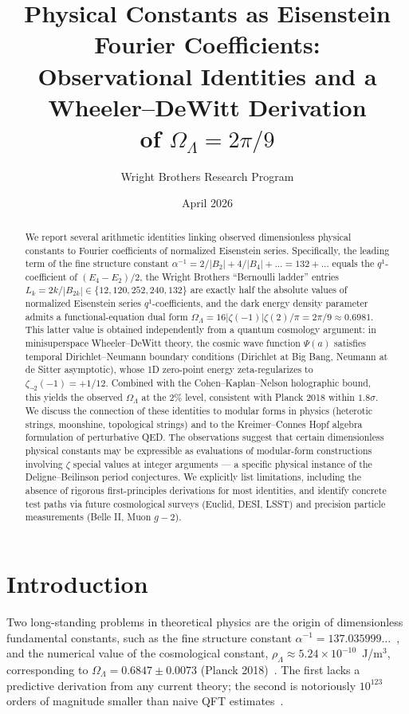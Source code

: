 \documentclass[11pt,a4paper]{article}
\title{Physical Constants as Eisenstein Fourier Coefficients:\\
Observational Identities and a Wheeler--DeWitt Derivation\\
of $\Omega_\Lambda = 2\pi/9$}
\author{Wright Brothers Research Program}
\date{April 2026}
\begin{document}
\maketitle

\begin{abstract}
We report several arithmetic identities linking observed dimensionless
physical constants to Fourier coefficients of normalized Eisenstein
series. Specifically, the leading term of the fine structure constant
$\alpha^{-1} = 2/|B_2| + 4/|B_4| + \ldots = 132 + \ldots$ equals the
$q^1$-coefficient of $(E_4 - E_2)/2$, the Wright Brothers ``Bernoulli
ladder'' entries $L_k = 2k/|B_{2k}| \in \{12, 120, 252, 240, 132\}$
are exactly half the absolute values of normalized Eisenstein series
$q^1$-coefficients, and the dark energy density parameter admits a
functional-equation dual form
$\Omega_\Lambda = 16|\zeta(-1)|\zeta(2)/\pi = 2\pi/9 \approx 0.6981$.
This latter value is obtained independently from a quantum cosmology
argument: in minisuperspace Wheeler--DeWitt theory, the cosmic wave
function $\Psi(a)$ satisfies temporal Dirichlet--Neumann boundary
conditions (Dirichlet at Big Bang, Neumann at de Sitter asymptotic),
whose 1D zero-point energy zeta-regularizes to $\zeta_{\neg 2}(-1) =
+1/12$. Combined with the Cohen--Kaplan--Nelson holographic bound,
this yields the observed $\Omega_\Lambda$ at the 2\% level, consistent
with Planck 2018 within $1.8\sigma$. We discuss the connection of
these identities to modular forms in physics (heterotic strings,
moonshine, topological strings) and to the Kreimer--Connes Hopf
algebra formulation of perturbative QED. The observations suggest
that certain dimensionless physical constants may be expressible as
evaluations of modular-form constructions involving $\zeta$ special
values at integer arguments --- a specific physical instance of the
Deligne--Beilinson period conjectures. We explicitly list limitations,
including the absence of rigorous first-principles derivations for
most identities, and identify concrete test paths via future
cosmological surveys (Euclid, DESI, LSST) and precision particle
measurements (Belle II, Muon $g-2$).
\end{abstract}

\section{Introduction}

Two long-standing problems in theoretical physics are the origin of
dimensionless fundamental constants, such as the fine structure
constant $\alpha^{-1} = 137.035999\ldots$~\cite{Mohr2016}, and the
numerical value of the cosmological constant, $\rho_\Lambda \approx
5.24 \times 10^{-10}$~J/m$^3$, corresponding to
$\Omega_\Lambda = 0.6847 \pm 0.0073$ (Planck 2018)~\cite{Planck2018}.
The first lacks a predictive derivation from any current theory; the
second is notoriously $10^{123}$ orders of magnitude smaller than
naive QFT estimates~\cite{Weinberg1989}.
\end{document}
